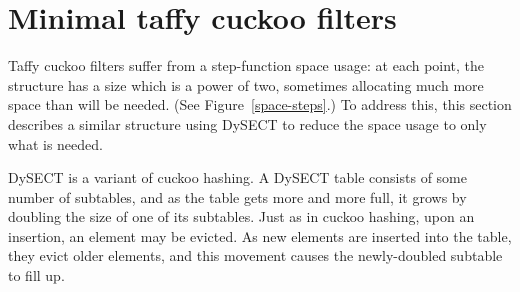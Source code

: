 \documentclass[sigconf]{acmart}
\newcommand{\ints}{\mathbb{Z}}
\begin{document}






\section{Minimal taffy cuckoo filters}
\label{mtcf}

Taffy cuckoo filters suffer from a step-function space usage:
at each point, the structure has a size which is a power of two, sometimes allocating much more space than will be needed. (See Figure~\ref{space-steps}.)
To address this, this section describes a similar structure using DySECT to reduce the space usage to only what is needed.~\cite{dysect}

DySECT is a variant of cuckoo hashing.
A DySECT table consists of some number of subtables, and as the table gets more and more full, it grows by doubling the size of one of its subtables.
Just as in cuckoo hashing, upon an insertion, an element may be evicted.
As new elements are inserted into the table, they evict older elements, and this movement causes the newly-doubled subtable to fill up.
\end{document}

